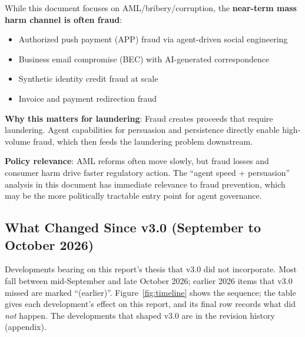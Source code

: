 \documentclass[11pt,letterpaper]{article}
\begin{document}
\begin{warnbox}
While this document focuses on AML/bribery/corruption, the \textbf{near-term mass harm channel is often fraud}:
\begin{itemize}
  \item Authorized push payment (APP) fraud via agent-driven social engineering
  \item Business email compromise (BEC) with AI-generated correspondence
  \item Synthetic identity credit fraud at scale
  \item Invoice and payment redirection fraud
\end{itemize}

\textbf{Why this matters for laundering}: Fraud creates proceeds that require laundering. Agent capabilities for persuasion and persistence directly enable high-volume fraud, which then feeds the laundering problem downstream.

\textbf{Policy relevance}: AML reforms often move slowly, but fraud losses and consumer harm drive faster regulatory action. The ``agent speed + persuasion'' analysis in this document has immediate relevance to fraud prevention, which may be the more politically tractable entry point for agent governance.
\end{warnbox}

\subsection{What Changed Since v3.0 (September to October 2026)}

Developments bearing on this report's thesis that v3.0 did not incorporate. Most fall between mid-September and late October 2026; earlier 2026 items that v3.0 missed are marked ``(earlier)''. Figure~\ref{fig:timeline} shows the sequence; the table gives each development's effect on this report, and its final row records what did \textit{not} happen. The developments that shaped v3.0 are in the revision history (appendix).
\end{document}
